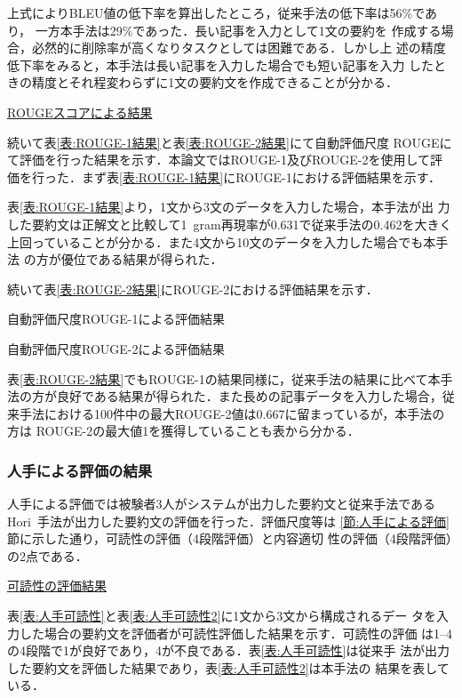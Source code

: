 \documentclass[japanese]{jnlp_1.4}
\begin{document}
上式によりBLEU値の低下率を算出したところ，従来手法の低下率は56\%であり，
一方本手法は29\%であった．長い記事を入力として1文の要約を
作成する場合，必然的に削除率が高くなりタスクとしては困難である．しかし上
述の精度低下率をみると，本手法は長い記事を入力した場合でも短い記事を入力
したときの精度とそれ程変わらずに1文の要約文を作成できることが分かる．


\noindent \ul{\mbox{ROUGEスコアによる結果}}

続いて表\ref{表:ROUGE-1結果}と表\ref{表:ROUGE-2結果}にて自動評価尺度
ROUGEにて評価を行った結果を示す．本論文ではROUGE-1及びROUGE-2を使用して評
価を行った．まず表\ref{表:ROUGE-1結果}にROUGE-1における評価結果を示す．

表\ref{表:ROUGE-1結果}より，1文から3文のデータを入力した場合，本手法が出
力した要約文は正解文と比較して1~gram再現率が0.631で従来手法の0.462を大きく
上回っていることが分かる．また4文から10文のデータを入力した場合でも本手法
の方が優位である結果が得られた．


続いて表\ref{表:ROUGE-2結果}にROUGE-2における評価結果を示す．

\begin{table}[t]
\caption{自動評価尺度ROUGE-1による評価結果} \label{表:ROUGE-1結果}

\end{table}
\begin{table}[t]
\caption{自動評価尺度ROUGE-2による評価結果} \label{表:ROUGE-2結果}

\end{table}

表\ref{表:ROUGE-2結果}でもROUGE-1の結果同様に，従来手法の結果に比べて本手
法の方が良好である結果が得られた．また長めの記事データを入力した場合，従
来手法における100件中の最大ROUGE-2値は0.667に留まっているが，本手法の方は
ROUGE-2の最大値1を獲得していることも表から分かる．

\subsubsection{人手による評価の結果}\label{節:人手による評価の結果}

人手による評価では被験者3人がシステムが出力した要約文と従来手法である
Hori~\cite{hori:2002th}手法が出力した要約文の評価を行った．評価尺度等は
\ref{節:人手による評価}節に示した通り，可読性の評価（4段階評価）と内容適切
性の評価（4段階評価）の2点である．


\vspace{1\baselineskip}
\noindent \ul{可読性の評価結果}

表\ref{表:人手可読性}と表\ref{表:人手可読性2}に1文から3文から構成されるデー
タを入力した場合の要約文を評価者が可読性評価した結果を示す．可読性の評価
は1--4の4段階で1が良好であり，4が不良である．表\ref{表:人手可読性}は従来手
法が出力した要約文を評価した結果であり，表\ref{表:人手可読性2}は本手法の
結果を表している．
\end{document}
